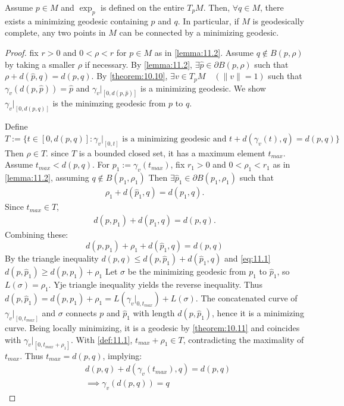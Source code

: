 \begin{theorem}\label{theorem:11.3}
Assume $p \in M$ and $\exp_p$ is defined on the entire $T_pM$. Then, $\forall q \in M$, there exists a minimizing geodesic containing $p$ and $q$.
In particular, if $M$ is geodesically complete, any two points in $M$ can be connected by a minimizing geodesic.
\end{theorem}

\begin{proof}
fix $r>0$ and $0 < \rho <r$ for $p \in M$ as in \autoref{lemma:11.2}.
Assume $q \notin B(p,\rho)$ by taking a smaller $\rho$ if necessary.
By \autoref{lemma:11.2}, $\exists \hat{p} \in \partial B(p,\rho)$ such that $\rho + d(\hat{p},q) = d(p,q)$.
By \autoref{theorem:10.10}, $\exists v \in T_pM \quad (\|v\| =1)$ such that
$\gamma_v (d(p,\hat{p})) = \hat{p}$ and $\gamma_v |_{[0,d(p,\hat{p})]}$ is a minimizing geodesic.
We show $\gamma_v |_{[0,d(p,q)]}$ is the minimzing geodesic from $p$ to $q$.

Define $T := \{t \in [0,d(p,q)] : \gamma_v |_{[0,t]} \text{ is a minimizing geodesic and } t+d(\gamma_v(t),q) = d(p,q)\}$
Then $\rho \in T$. since $T$ is a bounded closed set, it has a maximum element $t_{max}$. Assume $t_{max} < d(p,q)$.
For $p_1 := \gamma_v (t_{max})$, fix $r_1 > 0$ and $0<\rho_1 <r_1$ as in \autoref{lemma:11.2}, assuming $q \notin B(p_1, \rho_1)$
Then $\exists \hat{p}_1 \in \partial B(p_1, \rho_1)$ such that
\[
\begin{aligned}
    \rho_1 + d(\hat{p}_1,q) = d(p_1,q).
\end{aligned}
\]
Since $t_{max} \in T$,
\[
\begin{aligned}
    d(p,p_1) + d(p_1,q) = d(p,q).
\end{aligned}
\]
Combining these:
\begin{equation}\label{eq:11.1}
    d(p,p_1) + \rho_1 + d(\hat{p}_1,q) = d(p,q)
\end{equation}
By the triangle inequality $d(p,q) \leq d(p, \hat{p}_1) + d(\hat{p}_1,q)$ and \autoref{eq:11.1} $d(p, \hat{p}_1) \geq d(p, p_1) + \rho_1$
Let $\sigma$ be the minimizing geodesic from $p_1$ to $\hat{p}_1$, so $L(\sigma) = \rho_1$. Yje triangle inequality yields the reverse inequality.
Thus $d(p, \hat{p}_1) = d(p,p_1) + \rho_1 = L(\gamma_v|_{0,t_{max}})+L(\sigma)$.
The concatenated curve of $\gamma_v |_{[0, t_{max}]}$ and $\sigma$ connects $p$ and $\hat{p}_1$ with length $d(p, \hat{p}_1)$, hence it is a minimizing curve.
Being locally minimizing, it is a geodesic by \autoref{theorem:10.11} and coincides with $\gamma_v |_{[0,t_{max}+\rho_1]}$. With \autoref{def:11.1},
$t_{max} + \rho_1 \in T$, contradicting the maximality of $t_{max}$.
Thus $t_{max}=d(p,q)$, implying:
\[
\begin{aligned}
    &d(p,q) + d(\gamma_v(t_{max}),q) = d(p,q) \\
    &\implies \gamma_v (d(p,q)) =q
\end{aligned}
\]  
\end{proof}
 
